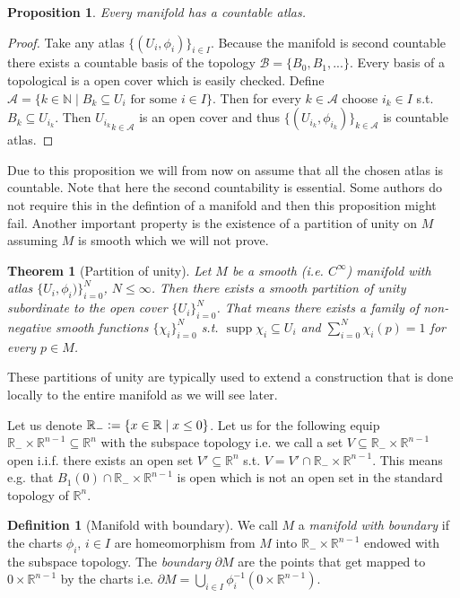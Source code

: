 \documentclass[12pt,a4paper]{article}
\numberwithin{equation}{subsection}
\numberwithin{lemma}{subsection}
\newtheorem{proposition}[lemma]{Proposition}
\newtheorem{theorem}[lemma]{Theorem}
\theoremstyle{definition}
\newtheorem{definition}[lemma]{Definition}
\DeclareMathOperator{\supp}{supp}
\newcommand{\naturalnum}{\mathbb{N}}
\newcommand{\real}{\mathbb{R}}
\begin{document}
\begin{proposition}
    Every manifold has a countable atlas. 
\end{proposition}
\begin{proof}
    Take any atlas $\{(U_i, \phi_i) \}_{i \in I}$. Because the manifold is 
    second countable there exists a countable basis of the topology 
    $\mathcal{B} = \{ B_0, B_1, ... \}$. Every basis of a topological is 
    a open cover which is easily checked. Define 
    $\mathcal{A} = \{ k \in \naturalnum \mid B_k \subseteq U_i \text{ for some 
    $i \in I$} \}$. Then for every $k \in \mathcal{A}$ choose 
    $i_k \in I$ s.t. $B_k \subseteq U_{i_k}$. Then ${U_{i_k}}_{k\in \mathcal{A}}$ 
    is an open cover and thus $\{ (U_{i_k}, \phi_{i_k}) \}_{k \in \mathcal{A}}$
    is countable atlas.
\end{proof}
Due to this proposition we will from now on assume that all the chosen atlas
is countable.
Note that here the second countability is essential. Some authors do not 
require this in the defintion of a manifold and then this proposition might fail.
Another important property is the existence of a partition of unity on $M$ 
assuming $M$ is smooth which we will not prove.

\begin{theorem}[Partition of unity]
    Let $M$ be a smooth (i.e. $C^\infty$) manifold with atlas 
    $\{U_i, \phi_i)\}_{i=0}^N$, $N \leq \infty$. Then there exists a smooth
    partition of unity subordinate to the open cover $\{U_i\}_{i=0}^N$.
    That means there exists a family of non-negative smooth functions $\{ \chi_i \}_{i=0}^N$
    s.t. $\supp \chi_i \subseteq U_i$ and $\sum_{i=0}^N \chi_i(p) = 1$ 
    for every $p \in M$.
\end{theorem}
These partitions of unity are typically used to extend a construction that 
is done locally to the entire manifold as we will see later.

Let us denote $\real_- \vcentcolon= \{ x \in \real \mid x \leq 0 \}$. 
Let us for the following equip $\real_- \times \real^{n-1} \subseteq \real^n$ with the 
subspace topology i.e. we call a set $V \subseteq \real_- \times \real^{n-1}$ 
open i.i.f. there exists an open set $V' \subseteq \real^n$ s.t. 
$V = V' \cap \real_- \times \real^{n-1}$. This means e.g. that 
$B_1(0) \cap \real_- \times \real^{n-1}$ is open which is not an open set 
in the standard topology of $\real^n$.
\begin{definition}[Manifold with boundary]
    We call $M$ a \textit{manifold with boundary} if the charts $\phi_i$, 
    $i\in I$ are homeomorphism from $M$ into $\real_- \times \real^{n-1}$ 
    endowed with the subspace topology. The \textit{boundary} 
    $\partial M$ are the points that get mapped to ${0} \times \real^{n-1}$ 
    by the charts i.e. $\partial M = \bigcup_{i\in I} \phi_i^{-1}({0} \times \real^{n-1})$.
\end{definition}
\end{document}
